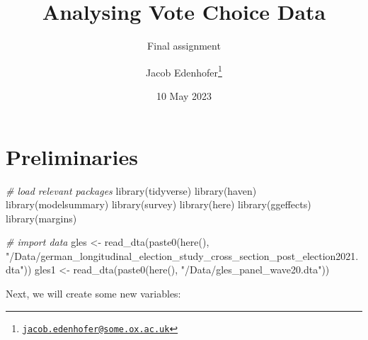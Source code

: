 \documentclass[
]{article}
\title{Analysing Vote Choice Data}
\subtitle{Final assignment}
\author{Jacob Edenhofer\footnote{\href{mailto:jacob.edenhofer@some.ox.ac.uk}{\nolinkurl{jacob.edenhofer@some.ox.ac.uk}}}}
\date{10 May 2023}
\newenvironment{Shaded}{\begin{snugshade}}{\end{snugshade}}
\newcommand{\CommentTok}[1]{\textcolor[rgb]{0.56,0.35,0.01}{\textit{#1}}}
\newcommand{\FunctionTok}[1]{\textcolor[rgb]{0.00,0.00,0.00}{#1}}
\newcommand{\NormalTok}[1]{#1}
\newcommand{\OtherTok}[1]{\textcolor[rgb]{0.56,0.35,0.01}{#1}}
\newcommand{\StringTok}[1]{\textcolor[rgb]{0.31,0.60,0.02}{#1}}
\begin{document}
\maketitle

\hypertarget{preliminaries}{%
\section{Preliminaries}\label{preliminaries}}

\begin{Shaded}
\begin{Highlighting}[]
\CommentTok{\# load relevant packages }
\FunctionTok{library}\NormalTok{(tidyverse)}
\FunctionTok{library}\NormalTok{(haven)}
\FunctionTok{library}\NormalTok{(modelsummary)}
\FunctionTok{library}\NormalTok{(survey)}
\FunctionTok{library}\NormalTok{(here)}
\FunctionTok{library}\NormalTok{(ggeffects)}
\FunctionTok{library}\NormalTok{(margins)}

\CommentTok{\# import data }
\NormalTok{gles }\OtherTok{\textless{}{-}} \FunctionTok{read\_dta}\NormalTok{(}\FunctionTok{paste0}\NormalTok{(}\FunctionTok{here}\NormalTok{(), }\StringTok{"/Data/german\_longitudinal\_election\_study\_cross\_section\_post\_election2021.dta"}\NormalTok{))}
\NormalTok{gles1 }\OtherTok{\textless{}{-}} \FunctionTok{read\_dta}\NormalTok{(}\FunctionTok{paste0}\NormalTok{(}\FunctionTok{here}\NormalTok{(), }\StringTok{"/Data/gles\_panel\_wave20.dta"}\NormalTok{))}
\end{Highlighting}
\end{Shaded}

Next, we will create some new variables:
\end{document}
